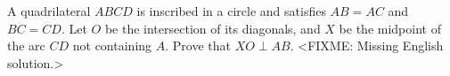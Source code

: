 \problem
A quadrilateral $ABCD$ is inscribed in a circle and satisfies $AB = AC$ and
$BC = CD$.
Let $O$ be the intersection of its diagonals, and $X$ be the midpoint of the
arc $CD$ not containing $A$.
Prove that $XO \perp AB$.
\solution
<FIXME: Missing English solution.>
\endproblem
